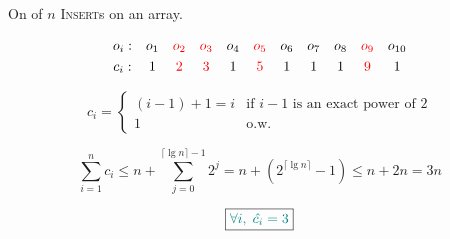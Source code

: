 \begin{frame}{}
  \centerline{}

  \pause
  \vspace{0.30cm}
  \centerline{On  of $n$ \textsc{Insert}s on an  array.}

  \pause
  \vspace{0.30cm}
  \[
    \begin{array}{ccccccccccc}
      o_i:  & o_1 & \textcolor{red}{o_2} & \textcolor{red}{o_3} & o_4 & \textcolor{red}{o_5} & o_6 & o_7 & o_8 & \textcolor{red}{o_9} & o_{10} \\[3pt]
      c_i:  & 1 & \textcolor{red}{2} & \textcolor{red}{3} & 1 & \textcolor{red}{5} & 1 & 1 & 1 & \textcolor{red}{9} & 1  \\
    \end{array}
  \]

  \pause
  \vspace{0.30cm}
  \begin{displaymath}
    c_i = \left\{ \begin{array}{ll}
      (i-1)+1 = i & \textrm{if $i - 1$ is an exact power of 2}\\
      1 & \textrm{o.w.}
    \end{array} \right.
  \end{displaymath}

  \pause
  \vspace{0.30cm}
  \[
    \sum_{i=1}^{n} c_i \le n + \sum_{j=0}^{\lceil \lg n \rceil - 1} 2^{j} = n +
    (2^{\lceil \lg n \rceil} - 1) \le n + 2n = 3n
  \]

  \pause
  \[
    \boxed{\textcolor{teal}{\forall i,\; \hat{c_i} = 3}}
  \]
\end{frame}
